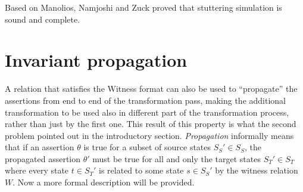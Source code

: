 Based on Manolios\cite{manolios2003compositional}, Namjoshi and Zuck proved that stuttering simulation is sound and complete.



\section{Invariant propagation}
\label{sec:invariant_propagation}

A relation that satisfies the Witness format can also be used to ``propagate'' the assertions from end to end of the transformation pass, making the additional transformation to be used also in different part of the transformation process, rather than just by the first one. This result of this property is what the second problem pointed out in the introductory section. \emph{Propagation} informally means that if an assertion $\theta$ is true for a subset of source states $S_S' \in S_S$, the propagated assertion $\theta'$ must be true for all and only the target states $S_T' \in S_T$ where every state $t \in S_T'$ is related to some state $s \in S_S'$ by the witness relation $W$. Now a more formal description will be provided.

